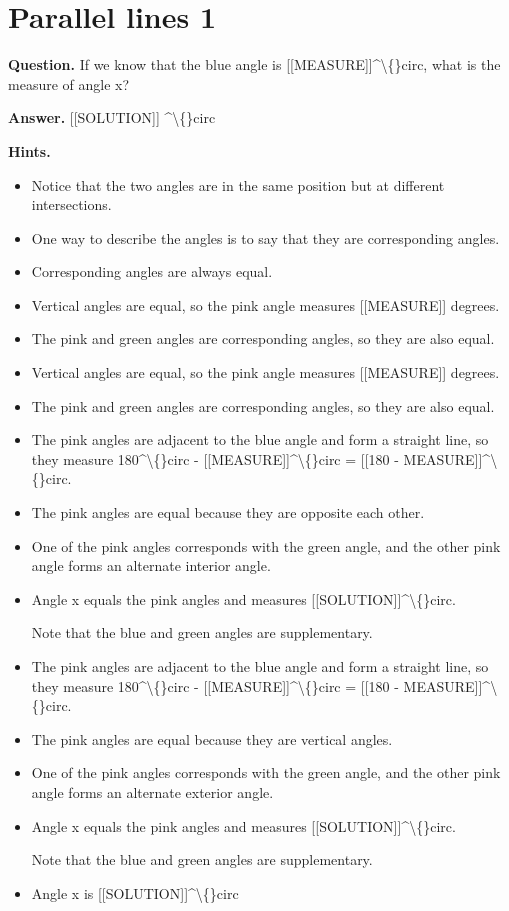 \documentclass{article}
\begin{document}
\section*{Parallel lines 1}
\textbf{Question.} If we know that the blue angle is [[MEASURE]]\textasciicircum{}\textbackslash\{\}circ,
        what is the measure of angle x?

\textbf{Answer.} [[SOLUTION]] \textasciicircum{}\textbackslash\{\}circ

\textbf{Hints.}
\begin{itemize}
  \item Notice that the two angles are in the same position but at different intersections.
  \item One way to describe the angles is to say that they are corresponding angles.
  \item Corresponding angles are always equal.
  \item Vertical angles are equal, so the pink angle measures [[MEASURE]] degrees.
  \item The pink and green angles are corresponding angles, so they are also equal.
  \item Vertical angles are equal, so the pink angle measures [[MEASURE]] degrees.
  \item The pink and green angles are corresponding angles, so they are also equal.
  \item The pink angles are adjacent to the blue angle and form a straight line,
                        so they measure 180\textasciicircum{}\textbackslash\{\}circ - [[MEASURE]]\textasciicircum{}\textbackslash\{\}circ = [[180 - MEASURE]]\textasciicircum{}\textbackslash\{\}circ.
  \item The pink angles are equal because they are opposite each other.
  \item One of the pink angles corresponds with the green angle, and the other pink angle forms an alternate interior angle.
  \item Angle x equals the pink angles and measures [[SOLUTION]]\textasciicircum{}\textbackslash\{\}circ.
                    
                    Note that the blue and green angles are supplementary.
  \item The pink angles are adjacent to the blue angle and form a straight line,
                        so they measure 180\textasciicircum{}\textbackslash\{\}circ - [[MEASURE]]\textasciicircum{}\textbackslash\{\}circ = [[180 - MEASURE]]\textasciicircum{}\textbackslash\{\}circ.
  \item The pink angles are equal because they are vertical angles.
  \item One of the pink angles corresponds with the green angle, and the other pink angle forms an alternate exterior angle.
  \item Angle x equals the pink angles and measures [[SOLUTION]]\textasciicircum{}\textbackslash\{\}circ.
                    
                    Note that the blue and green angles are supplementary.
  \item Angle x is [[SOLUTION]]\textasciicircum{}\textbackslash\{\}circ
\end{itemize}
\end{document}
